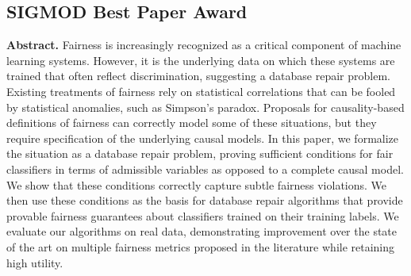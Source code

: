 \clearpage

\subsection*{SIGMOD Best Paper Award}

\vspace{2mm}

\textbf{Abstract.} Fairness is increasingly recognized as a critical component of machine learning systems. However, it is the underlying data on which these systems are trained that often reflect discrimination, suggesting a database repair problem. Existing treatments of fairness rely on statistical correlations that can be fooled by statistical anomalies, such as Simpson's paradox. Proposals for causality-based definitions of fairness can correctly model some of these situations, but they require specification of the underlying causal models. In this paper, we formalize the situation as a database repair problem, proving sufficient conditions for fair classifiers in terms of admissible variables as opposed to a complete causal model. We show that these conditions correctly capture subtle fairness violations. We then use these conditions as the basis for database repair algorithms that provide provable fairness guarantees about classifiers trained on their training labels. We evaluate our algorithms on real data, demonstrating improvement over the state of the art on multiple fairness metrics proposed in the literature while retaining high utility.

\vspace{2mm}

~\\




